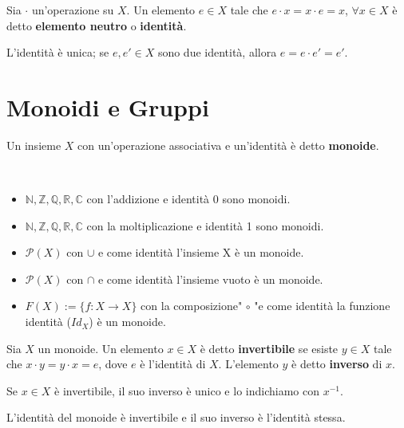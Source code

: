 \documentclass[../main.tex]{subfiles}
\begin{document}
\begin{definition}[Identità]
    Sia $\cdot$ un'operazione su $X$. Un elemento $e \in X$ tale che $e \cdot x = x \cdot e = x$, $\forall x \in X$ è detto \textbf{elemento neutro} o \textbf{identità}.
\end{definition}

L'identità è unica; se $e,e' \in X$ sono due identità, allora $e = e \cdot e' = e'$.

\section{Monoidi e Gruppi}

\begin{definition}[Monoide]
    Un insieme $X$ con un'operazione associativa e un'identità è detto \newline \textbf{monoide}.
\end{definition}

\begin{example}
    \
    \begin{itemize}
        \item $\mathbb{N,Z,Q,R,C}$ con l'addizione e identità 0 sono monoidi.
        \item $\mathbb{N,Z,Q,R,C}$ con la moltiplicazione e identità 1 sono monoidi.
        \item $\mathcal{P} (X)$ con $\cup$  e come identità l'insieme X è un monoide.
        \item $\mathcal{P} (X)$ con $\cap$  e come identità l'insieme vuoto è un monoide.
        \item $F(X):= \{f: X \rightarrow X\}$ con la composizione" $\circ$ "e come identità
              la funzione identità ($Id_X$) è un monoide.
    \end{itemize}
\end{example}

\begin{definition}[Inverso]
    Sia $X$ un monoide. Un elemento $x \in X$ è detto \textbf{invertibile} se esiste $y \in X$ tale che
    $x \cdot y = y \cdot x = e$, dove $e$ è l'identità di $X$. L'elemento $y$ è detto \textbf{inverso} di $x$.
\end{definition}

Se $x \in X$ è invertibile, il suo inverso è unico e lo indichiamo con $x^{-1}$.
\begin{remark}
    L'identità del monoide è invertibile e il suo inverso è l'identità stessa.
\end{remark}
\end{document}
